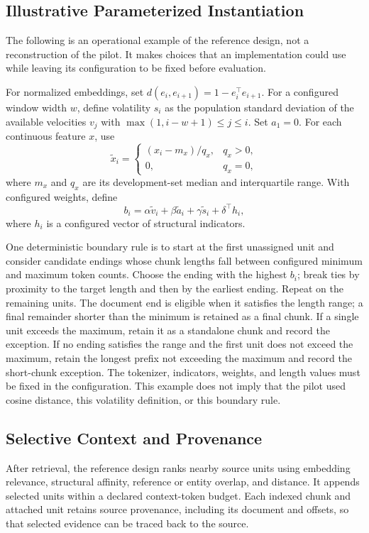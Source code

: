 \documentclass[10pt]{article}
\begin{document}
\subsection{Illustrative Parameterized Instantiation}

The following is an operational example of the reference design, not a reconstruction of the pilot. It makes choices that an implementation could use while leaving its configuration to be fixed before evaluation.

For normalized embeddings, set $d(e_i,e_{i+1})=1-e_i^\top e_{i+1}$. For a configured window width $w$, define volatility $s_i$ as the population standard deviation of the available velocities $v_j$ with $\max(1,i-w+1)\leq j\leq i$. Set $a_1=0$. For each continuous feature $x$, use
\[
\widetilde{x}_i =
\begin{cases}
(x_i-m_x)/q_x, & q_x>0,\\
0, & q_x=0,
\end{cases}
\]
where $m_x$ and $q_x$ are its development-set median and interquartile range. With configured weights, define
\[
b_i=\alpha\widetilde v_i+\beta\widetilde a_i
    +\gamma\widetilde s_i+\delta^\top h_i,
\]
where $h_i$ is a configured vector of structural indicators.

One deterministic boundary rule is to start at the first unassigned unit and consider candidate endings whose chunk lengths fall between configured minimum and maximum token counts. Choose the ending with the highest $b_i$; break ties by proximity to the target length and then by the earliest ending. Repeat on the remaining units. The document end is eligible when it satisfies the length range; a final remainder shorter than the minimum is retained as a final chunk. If a single unit exceeds the maximum, retain it as a standalone chunk and record the exception. If no ending satisfies the range and the first unit does not exceed the maximum, retain the longest prefix not exceeding the maximum and record the short-chunk exception. The tokenizer, indicators, weights, and length values must be fixed in the configuration. This example does not imply that the pilot used cosine distance, this volatility definition, or this boundary rule.

\subsection{Selective Context and Provenance}
\label{sec:context}

After retrieval, the reference design ranks nearby source units using embedding relevance, structural affinity, reference or entity overlap, and distance. It appends selected units within a declared context-token budget. Each indexed chunk and attached unit retains source provenance, including its document and offsets, so that selected evidence can be traced back to the source.
\end{document}
